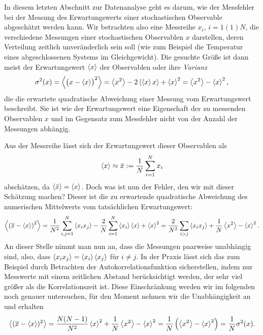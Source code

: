 In diesem letzten Abschnitt zur Datenanalyse geht es darum, wie der
Messfehler bei der Messung des Erwartungswerts einer stochastischen
Observable abgeschätzt werden kann. Wir betrachten also eine Messreihe
$x_i$, $i=1(1)N$, die verschiedene Messungen einer stochastischen
Observablen $x$ darstellen, deren Verteilung zeitlich unveränderlich
sein soll (wie zum Beispiel die Temperatur eines abgeschlossenen
Systems im Gleichgewicht). Die gesuchte Größe ist dann meist der
Erwartungswert $\left\langle{x}\right\rangle$ der Observablen oder ihre \emph{Varianz}
\begin{equation}
  \sigma^2(x) = \left\langle{\bigl(x-\left\langle{x}\right\rangle\bigr)^2}\right\rangle
  = \left\langle{x^2}\right\rangle - 2\left\langle{\left\langle{x}\right\rangle x}\right\rangle  + \left\langle{x}\right\rangle^2
  = \left\langle{x^2}\right\rangle - \left\langle{x}\right\rangle^2,
\end{equation}
die die erwartete quadratische Abweichung einer Messung vom
Erwartungswert beschreibt. Sie ist wie der Erwartungswert eine
Eigenschaft der zu messenden Observablen $x$ und im Gegensatz zum
Messfehler nicht von der Anzahl der Messungen abhängig.

Aus der Messreihe lässt sich der Erwartungswert dieser Observablen als
\begin{equation}
  \label{eq:mean}
  \left\langle{x}\right\rangle \approx \bar{x} := \frac{1}{N}\sum_{i=1}^N x_i
\end{equation}
abschätzen, da $\left\langle{\bar{x}}\right\rangle = \left\langle{x}\right\rangle$. Doch was ist nun der
Fehler, den wir mit dieser Schätzung machen? Dieser ist die zu
erwartende quadratische Abweichung des numerischen Mittelwerts vom
tatsächlichen Erwartungswert:
\begin{equation}
  \left\langle{\left(\overline{x} - \left\langle{x}\right\rangle\right)^2}\right\rangle =
  \frac{1}{N^2}\sum_{i,j=1}^N \left\langle{x_ix_j}\right\rangle -
  \frac{2}{N}\sum_{i=1}^N \left\langle{x_i}\right\rangle\left\langle{x}\right\rangle + \left\langle{x}\right\rangle^2
  = \frac{2}{N^2}\sum_{i > j} \left\langle{x_ix_j}\right\rangle
  + \frac{1}{N}\left\langle{x^2}\right\rangle - \left\langle{x}\right\rangle^2.
\end{equation}
An dieser Stelle nimmt man nun an, dass die Messungen paarweise
unabhängig sind, also, dass $\left\langle{x_ix_j}\right\rangle = \left\langle{x_i}\right\rangle\left\langle{x_j}\right\rangle$ für
$i\neq j$. In der Praxis lässt sich das zum Beispiel durch Betrachten
der Autokorrelationsfunktion sicherstellen, indem nur Messwerte mit
einem zeitlichen Abstand berücksichtigt werden, der sehr viel größer
als die Korrelationszeit ist. Diese Einschränkung werden wir im
folgenden noch genauer untersuchen, für den Moment nehmen wir die
Unabhängigkeit an und erhalten
\begin{equation}
  \label{eq:errestvar}
  \left\langle{(\overline{x} - \left\langle{x}\right\rangle)^2}\right\rangle
  = \frac{N(N-1)}{N^2}\left\langle{x}\right\rangle^2 + \frac{1}{N}\left\langle{x^2}\right\rangle - \left\langle{x}\right\rangle^2
  = \frac{1}{N}\left(\left\langle{x^2}\right\rangle - \left\langle{x}\right\rangle^2\right)
  = \frac{1}{N}\sigma^2(x).
\end{equation}


